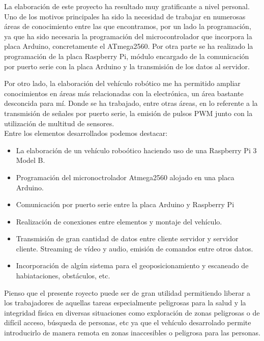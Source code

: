 La elaboración de este proyecto ha resultado muy gratificante a nivel personal. Uno de los motivos principales ha sido la necesidad de trabajar en numerosas áreas de 
conocimiento entre las que encontramos, por un lado la programación, ya que ha sido necesaria la programación del microcontrolador que incorpora la placa Arduino, 
concretamente el ATmega2560. Por otra parte se ha realizado la programación de la placa Raspberry Pi, módulo encargado de la comunicación por puerto serie con la placa Arduino y la 
transmisión de los datos al servidor. 

Por otro lado, la elaboración del vehículo robótico me ha permitido ampliar conocimientos en áreas más relacionadas con la electrónica, un área bastante desconcida para mí. 
Donde se ha trabajado, entre otras áreas, en lo referente a la transmisión de señales por puerto serie, la emisión de pulsos PWM junto con la utilización de multitud de sensores.\\

Entre los elementos desarrollados podemos destacar:\\

\begin{itemize}
 \item La elaboración de un vehículo roboótico haciendo uso de una Raspberry Pi 3 Model B.
 \item Programación del micronoctrolador Atmega2560 alojado en una placa Arduino.
 \item Comunicación por puerto serie entre la placa Arduino y Raspberry Pi
 \item Realización de conexiones entre elementos y montaje del vehículo.
 \item Transmisión de gran cantidad de datos entre cliente servidor y servidor cliente. Streaming de vídeo y audio, emisión de comandos entre otros datos.\\
 \item Incorporación de algún sistema para el geoposicionamiento y escaneado de habiataciones, obstáculos, etc.
\end{itemize}

Pienso que el presente royecto puede ser de gran utilidad permitiendo liberar a los trabajadores de aquellas tareas especialmente peligrosas para la salud y la integridad física en diversas situaciones 
como exploración de zonas peligrosas o de difícil acceso, búsqueda de personas, etc ya que el vehículo desarrolado permite introducirlo de manera remota en zonas inaccesibles 
o peligrosa para las personas.\\

